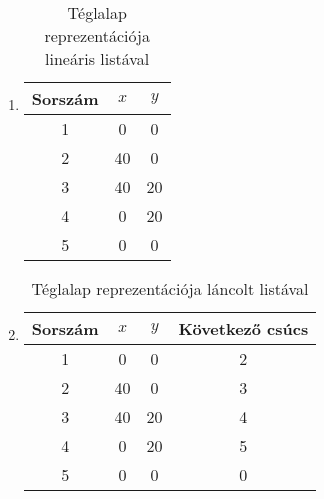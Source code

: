 \documentclass[../../main.tex]{subfiles}
\begin{document}
\begin{enumerate}
  \item {}
        \begin{table}[H]
          \centering
          \begin{tabular}{| c | c | c |}
            \hline
            Sorszám & $x$ & $y$
            \\ \hline \hline
            1       & 0   & 0
            \\ \hline
            2       & 40  & 0
            \\ \hline
            3       & 40  & 20
            \\ \hline
            4       & 0   & 20
            \\ \hline
            5       & 0   & 0
            \\ \hline
          \end{tabular}
          \caption{Téglalap reprezentációja lineáris listával}
          \label{table:rec-linlist}
        \end{table}

  \item {}
        \begin{table}[H]
          \centering
          \begin{tabular}{| c | c | c | c |}
            \hline
            Sorszám & $x$ & $y$ & Következő csúcs
            \\ \hline \hline
            1       & 0   & 0   & 2
            \\ \hline
            2       & 40  & 0   & 3
            \\ \hline
            3       & 40  & 20  & 4
            \\ \hline
            4       & 0   & 20  & 5
            \\ \hline
            5       & 0   & 0   & 0
            \\ \hline
          \end{tabular}
          \caption{Téglalap reprezentációja láncolt listával}
          \label{table:rec-forwardlist}
        \end{table}


\end{enumerate}
\end{document}
